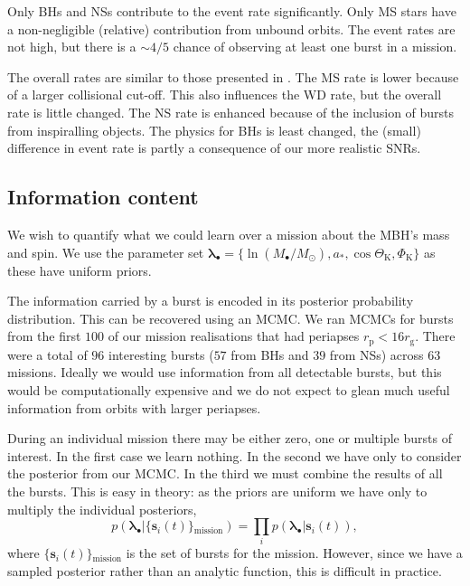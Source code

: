 \documentclass[useAMS,usedcolumn,usegraphicx,usenatbib]{mn2e}
\newcommand{\sub}[1]{\ensuremath{_\mathrm{#1}}}
\begin{document}
Only BHs and NSs contribute to the event rate significantly. Only MS stars have a non-negligible (relative) contribution from unbound orbits. The event rates are not high, but there is a $\sim 4/5$ chance of observing at least one burst in a mission.

The overall rates are similar to those presented in \citet{Hopman2007}. The MS rate is lower because of a larger collisional cut-off. This also influences the WD rate, but the overall rate is little changed. The NS rate is enhanced because of the inclusion of bursts from inspiralling objects. The physics for BHs is least changed, the (small) difference in event rate is partly a consequence of our more realistic SNRs.

\subsection{Information content}

We wish to quantify what we could learn over a mission about the MBH's mass and spin. We use the parameter set $\boldsymbol{\lambda}_\bullet = \{\ln (M_\bullet/M_\odot), a_\ast, \cos \Theta\sub{K}, \Phi\sub{K}\}$ as these have uniform priors.

The information carried by a burst is encoded in its posterior probability distribution. This can be recovered using an MCMC. We ran MCMCs for bursts from the first $100$ of our mission realisations that had periapses $r\sub{p} < 16 r\sub{g}$. There were a total of $96$ interesting bursts ($57$ from BHs and $39$ from NSs) across $63$ missions. Ideally we would use information from all detectable bursts, but this would be computationally expensive and we do not expect to glean much useful information from orbits with larger periapses.

During an individual mission there may be either zero, one or multiple bursts of interest. In the first case we learn nothing. In the second we have only to consider the posterior from our MCMC. In the third we must combine the results of all the bursts. This is easy in theory: as the priors are uniform we have only to multiply the individual posteriors,
\begin{equation}
p(\boldsymbol{\lambda}_\bullet|\{\boldsymbol{s}_i(t)\}\sub{mission}) = \prod_i p(\boldsymbol{\lambda}_\bullet|\boldsymbol{s}_i(t)),
\end{equation}
where $\{\boldsymbol{s}_i(t)\}\sub{mission}$ is the set of bursts for the mission. However, since we have a sampled posterior rather than an analytic function, this is difficult in practice.
\end{document}
